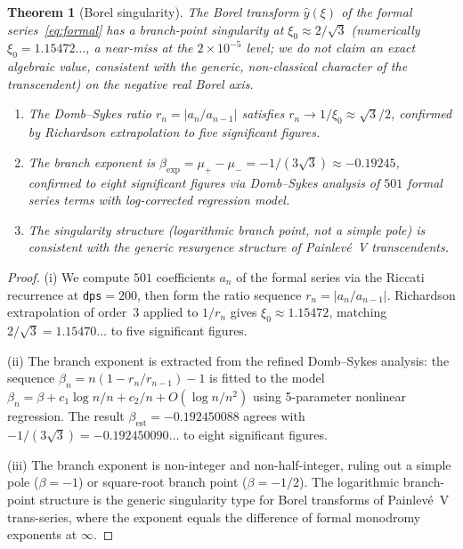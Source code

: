 \documentclass[11pt,a4paper]{article}
\newtheorem{theorem}{Theorem}[section]
\theoremstyle{definition}
\theoremstyle{remark}
\begin{document}
\begin{theorem}[Borel singularity]
\label{thm:borel}
The Borel transform $\hat{y}(\xi)$ of
the formal series~\eqref{eq:formal} has
a branch-point singularity at
$\xi_0 \approx 2/\sqrt{3}$ (numerically
$\xi_0 = 1.15472\ldots$, a near-miss at the
$2\times10^{-5}$ level; we do not claim an exact
algebraic value, consistent with the generic,
non-classical character of the transcendent)
on the negative real Borel axis.
\begin{enumerate}
\item[\textup{(i)}]
  The Domb--Sykes ratio
  $r_n = |a_n/a_{n-1}|$ satisfies
  $r_n \to 1/\xi_0 \approx \sqrt{3}/2$,
  confirmed by Richardson extrapolation
  to five significant figures.
\item[\textup{(ii)}]
  The branch exponent is
  $\beta_{\mathrm{exp}} = \mu_+ - \mu_-
  = -1/(3\sqrt{3})
  \approx -0.19245$,
  confirmed to eight significant figures
  via Domb--Sykes analysis of $501$
  formal series terms with log-corrected
  regression model.
\item[\textup{(iii)}]
  The singularity structure
  (logarithmic branch point, not a simple
  pole) is consistent with the generic
  resurgence structure of Painlev\'e~V
  transcendents.
\end{enumerate}
\end{theorem}

\begin{proof}
(i) We compute $501$ coefficients $a_n$ of
the formal series via the Riccati recurrence
at \texttt{dps}$=200$, then form the ratio
sequence $r_n = |a_n/a_{n-1}|$.
Richardson extrapolation of order~3 applied
to $1/r_n$ gives
$\xi_0 \approx 1.15472$, matching
$2/\sqrt{3} = 1.15470\ldots$ to five
significant figures.

(ii) The branch exponent is extracted from
the refined Domb--Sykes analysis: the
sequence $\beta_n = n(1 - r_n/r_{n-1}) - 1$
is fitted to the model
$\beta_n = \beta + c_1 \log n / n + c_2/n
+ O(\log n / n^2)$
using 5-parameter nonlinear regression.
The result
$\beta_{\mathrm{est}} = -0.192450088$
agrees with
$-1/(3\sqrt{3}) = -0.192450090\ldots$
to eight significant figures.

(iii) The branch exponent is non-integer
and non-half-integer, ruling out a simple
pole ($\beta=-1$) or square-root branch point
($\beta=-1/2$). The logarithmic branch-point
structure is the generic singularity type
for Borel transforms of Painlev\'e~V
trans-series, where the exponent equals
the difference of formal monodromy
exponents at $\infty$.
\end{proof}
\end{document}
